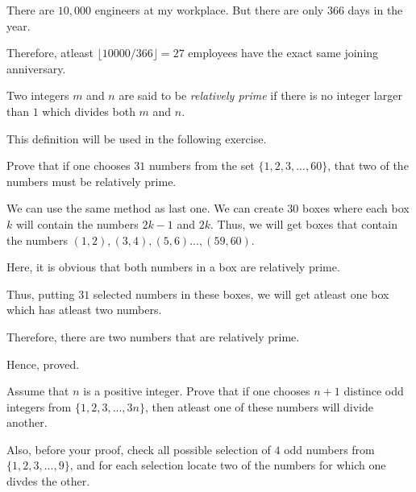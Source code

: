 \begin{solution}
	There are $10,000$ engineers at my workplace. But there are only $366$ days in the year. 

	Therefore, atleast $\lfloor 10000/366 \rfloor = 27$ employees have the exact same joining anniversary.
\end{solution}

\begin{named}[Definition]
	Two integers $m$ and $n$ are said to be \emph{relatively prime} if there is no integer larger than $1$ which divides both $m$ and $n$.
\end{named}

This definition will be used in the following exercise.

\begin{problem}
Prove that if one chooses $31$ numbers from the set $\{1,2,3,...,60\}$, 
that two of the numbers must be relatively prime.
\end{problem}

\begin{solution}
	We can use the same method as last one. We can create $30$ boxes where each box $k$ will contain the numbers $2k-1$ and $2k$. Thus, we will get boxes that contain the numbers $(1, 2), (3, 4), (5, 6) ..., (59, 60)$. 

	Here, it is obvious that both numbers in a box are relatively prime.

	Thus, putting $31$ selected numbers in these boxes, we will get atleast one box which has atleast two numbers.

	Therefore, there are two numbers that are relatively prime.

	Hence, proved.
\end{solution}

\begin{problem}
	Assume that $n$ is a positive integer. Prove that if one chooses $n+1$ distince odd integers from $\{1, 2, 3, ..., 3n\}$, then atleast one of these numbers will divide another.

	Also, before your proof, check all possible selection of $4$ odd numbers from $\{1, 2, 3, ..., 9\}$, and for each selection locate two of the numbers for which one divdes the other.
\end{problem}

